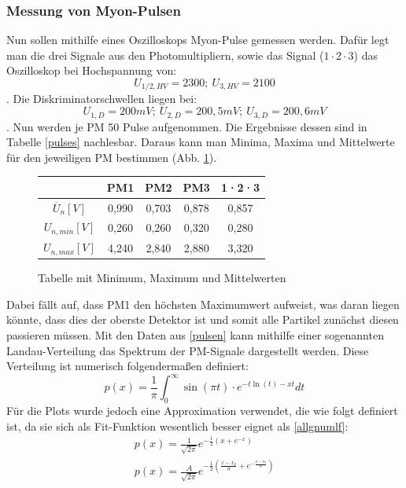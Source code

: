             \subsubsection{Messung von Myon-Pulsen}
            Nun sollen mithilfe eines Oszilloskops Myon-Pulse gemessen werden. Dafür legt man die drei Signale aus den Photomultipliern, sowie das Signal ($1\cdot 2 \cdot 3$) das Oszilloskop bei Hochspannung von: $$ U_{1/2,HV} = 2300;\ U_{3,HV} = 2100 $$. Die Diskriminatorschwellen liegen bei: $$ U_{1,D} = 200\unit{mV};\ U_{2,D} = 200,5\unit{mV};\ U_{3,D} = 200,6\unit{mV} $$. Nun werden je PM 50 Pulse aufgenommen. Die Ergebnisse dessen sind in Tabelle \ref{pulses} nachlesbar. Daraus kann man Minima, Maxima und Mittelwerte für den jeweiligen PM bestimmen (Abb. \ref{MWs}).
            \begin{figure}[htbp]
                \centering
                \begin{tabular}{c||c|c|c|c}
                    & PM1   & PM2   & PM3 & 1·2·3\\
                    \hline $\overline U_{n}  [\unit{V}]$  & 0,990 & 0,703 & 0,878 & 0,857\\
                    $U_{n,min} [\unit{V}]$& 0,260 & 0,260 & 0,320 & 0,280\\
                    $U_{n,max} [\unit{V}]$& 4,240 & 2,840 & 2,880 & 3,320\\ 
                \end{tabular}
                \caption{Tabelle mit Minimum, Maximum und Mittelwerten}
                \label{MWs}
            \end{figure}
            Dabei fällt auf, dass PM1 den höchsten Maximumwert aufweist, was daran liegen könnte, dass dies der oberste Detektor ist und somit alle Partikel zunächst diesen passieren müssen. 
            Mit den Daten aus \ref{pulsen} kann mithilfe einer sogenannten Landau-Verteilung das Spektrum der PM-Signale dargestellt werden. Diese Verteilung ist numerisch folgendermaßen definiert:
            \begin{equation}
            p(x) = \frac{1}{\pi} \int_{0}^{\infty} \sin(\pi t)\cdot e^{-t\ln(t)-xt} dt
            \label{allgnumlf}
            \end{equation}
            Für die Plots wurde jedoch eine Approximation verwendet, die wie folgt definiert ist, da sie sich als Fit-Funktion wesentlich besser eignet als \ref{allgnumlf}:
            \begin{eqnarray}
            p(x) = \frac{1}{\sqrt{2\pi}}e^{-\frac{1}{2}\left(x+e^{-x}\right)}\\                
            p(x) = \frac{A}{\sqrt{2\pi}}e^{-\frac{1}{2}\left(\frac{x-x_0}{\sigma}+e^{-\frac{x-x_0}{\sigma}}\right)}
            \label{qtilandaufitfunktion}
            \end{eqnarray}
